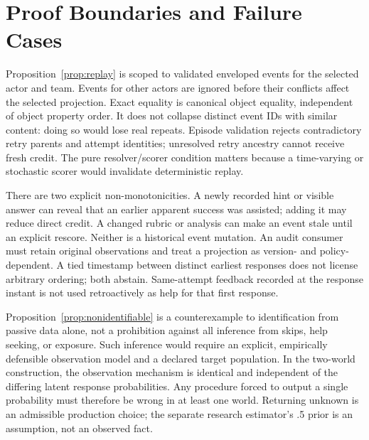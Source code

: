 \documentclass{article}
\begin{document}
\FloatBarrier
\section{Proof Boundaries and Failure Cases}
\label{app:proofs}

Proposition~\ref{prop:replay} is scoped to validated enveloped events for the selected actor and team. Events for other actors are ignored before their conflicts affect the selected projection. Exact equality is canonical object equality, independent of object property order. It does not collapse distinct event IDs with similar content: doing so would lose real repeats. Episode validation rejects contradictory retry parents and attempt identities; unresolved retry ancestry cannot receive fresh credit. The pure resolver/scorer condition matters because a time-varying or stochastic scorer would invalidate deterministic replay.

There are two explicit non-monotonicities. A newly recorded hint or visible answer can reveal that an earlier apparent success was assisted; adding it may reduce direct credit. A changed rubric or analysis can make an event stale until an explicit rescore. Neither is a historical event mutation. An audit consumer must retain original observations and treat a projection as version- and policy-dependent. A tied timestamp between distinct earliest responses does not license arbitrary ordering; both abstain. Same-attempt feedback recorded at the response instant is not used retroactively as help for that first response.

Proposition~\ref{prop:nonidentifiable} is a counterexample to identification from passive data alone, not a prohibition against all inference from skips, help seeking, or exposure. Such inference would require an explicit, empirically defensible observation model and a declared target population. In the two-world construction, the observation mechanism is identical and independent of the differing latent response probabilities. Any procedure forced to output a single probability must therefore be wrong in at least one world. Returning unknown is an admissible production choice; the separate research estimator's .5 prior is an assumption, not an observed fact.
\end{document}

